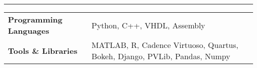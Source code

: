 \documentclass[10 pt]{article}%
\begin{document}
{{{{{{{{{{{\vspace{-1.5mm}
\hrule
\vspace{-2mm}
\begin{center}
\begin{tabular}{m{4.5cm}   m{12.5cm}} 
	\vspace{0.1cm}
	\textbf{Programming Languages} & \vspace{0.1cm} Python, C++, VHDL, Assembly\\ 
	\textbf{Tools \& Libraries} & MATLAB, R, Cadence Virtuoso, Quartus, Bokeh, Django, PVLib, Pandas, Numpy \\  
\end{tabular}
\end{center}



}}}}}}}}}}}
\end{document}
